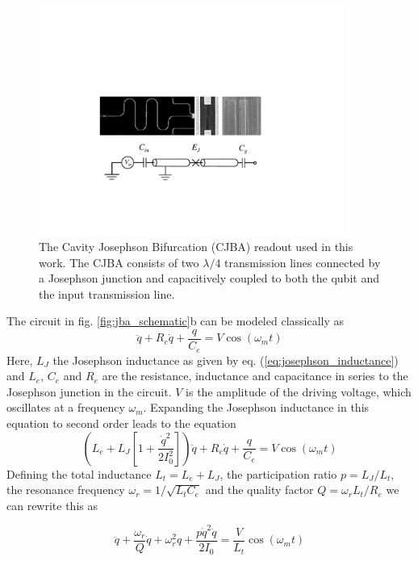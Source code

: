 \begin{figure}
	\includegraphics[width=10cm]{"./material/figures/introduction/jba"}
	\caption{The Cavity Josephson Bifurcation (CJBA) readout used in this work. The CJBA consists of two $\lambda/4$ transmission lines connected by a Josephson junction and capacitively coupled to both the qubit and the input transmission line.}
	\label{fig:cba_schematic}
\end{figure}

The circuit in fig. \ref{fig:jba_schematic}b can be modeled classically as
%
\begin{equation}
[L_e+L_J (i)]\ddot{q}+R_e \dot{q}+\frac{q}{C_e} = V \cos{\left(\omega_m t\right)}
\end{equation}
%
Here, $L_J$ the Josephson inductance as given by eq. (\ref{eq:josephson_inductance}) and $L_e$, $C_e$ and $R_e$ are the resistance, inductance and capacitance in series to the Josephson junction in the circuit. $V$ is the amplitude of the driving voltage, which oscillates at a frequency $\omega_m$. Expanding the Josephson inductance in this equation to second order leads to the equation
%
\begin{equation}
\left(L_e+L_J\left[1+\frac{\dot{q}^2}{2 I_0^2}\right]\right)\ddot{q}+R_e \dot{q}+\frac{q}{C_e} = V \cos{\left( \omega_m t\right)}
\end{equation}
%
Defining the total inductance $L_t = L_e+L_J$, the participation ratio $p=L_J/L_t$, the resonance frequency $\omega_r = 1/\sqrt{L_t C_e}$ and the quality factor $Q = \omega_r L_t / R_e$ we can rewrite this as

\begin{equation}
\ddot{q}+\frac{\omega_r}{Q}\dot{q}+\omega_r^2 q + \frac{p \dot{q}^2 \ddot{q}}{2 I_0} = \frac{V}{L_t}\cos{\left(\omega_m t \right)}
\end{equation}

